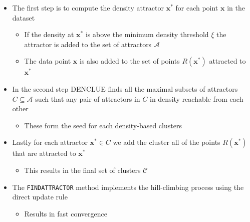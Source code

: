 \documentclass[a4, english]{article}
\begin{document}
\begin{itemize}
	\item The first step is to compute the density attractor $\pmb x^*$ for each point $\pmb x$ in the dataset
  \begin{itemize}
		\item If the density at $\pmb x^*$ is above the minimum density threshold $\xi$ the attractor is added to the set of attractors $\mathcal A$
		\item The data point $\pmb x$ is also added to the set of points $R(\pmb x^*)$ attracted to $\pmb x^*$
  \end{itemize}
	\item In the second step DENCLUE finds all the maximal subsets of attractors $C \subseteq \mathcal A$ such that any pair of attractors in $C$ in density reachable from each other
  \begin{itemize}
		\item These form the seed for each density-based clusters
  \end{itemize}
	\item Lastly for each attractor $\pmb x^* \in C$ we add the cluster all of the points $R(\pmb x^*)$ that are attracted to $\pmb x ^*$
  \begin{itemize}
		\item This results in the final set of clusters $\mathcal C$
  \end{itemize}
	\item The \texttt{FINDATTRACTOR} method implements the hill-climbing process using the direct update rule
  \begin{itemize}
		\item Results in fast convergence
  \end{itemize}
\end{itemize}
\end{document}
